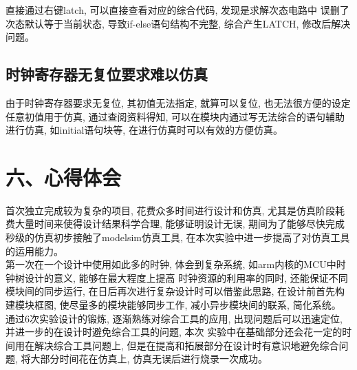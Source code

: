 \documentclass{article}
\newcommand{\fourhao}{\fontsize{14pt}{\baselineskip}\selectfont} %
\newcommand{\xiaosihao}{\fontsize{12pt}{\baselineskip}\selectfont} %
\begin{document}
直接通过右键latch, 可以直接查看对应的综合代码, 发现是求解次态电路中
误删了次态默认等于当前状态, 导致if-else语句结构不完整, 综合产生LATCH, 修改后解决问题。
\subsection*{时钟寄存器无复位要求难以仿真}
由于时钟寄存器要求无复位, 其初值无法指定, 就算可以复位, 也无法很方便的设定任意初值用于仿真, 通过查阅资料得知, 可以在模块内通过写无法综合的语句辅助进行仿真, 如initial语句块等, 在进行仿真时可以有效的方便仿真。
\section*{\fourhao 六、心得体会}
\xiaosihao
首次独立完成较为复杂的项目, 花费众多时间进行设计和仿真, 尤其是仿真阶段耗费大量时间来使得设计结果科学合理, 
能够证明设计无误, 期间为了能够尽快完成秒级的仿真初步接触了modelsim仿真工具, 在本次实验中进一步提高了对仿真工具的运用能力。\\

第一次在一个设计中使用如此多的时钟, 体会到复杂系统, 如arm内核的MCU中时钟树设计的意义, 能够在最大程度上提高
时钟资源的利用率的同时, 还能保证不同模块间的同步运行, 在日后再次进行复杂设计时可以借鉴此思路, 在设计前首先构建模块框图, 
使尽量多的模块能够同步工作, 减小异步模块间的联系, 简化系统。\\

通过6次实验设计的锻炼, 逐渐熟练对综合工具的应用, 出现问题后可以迅速定位, 并进一步的在设计时避免综合工具的问题, 本次
实验中在基础部分还会花一定的时间用在解决综合工具问题上, 但是在提高和拓展部分在设计时有意识地避免综合问题, 将大部分时间花在仿真上, 
仿真无误后进行烧录一次成功。\\
\end{document}
